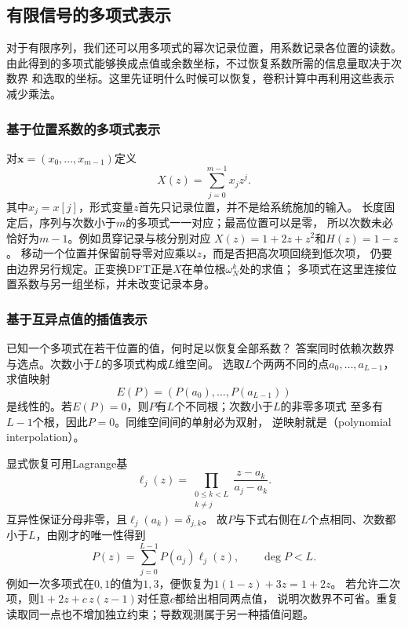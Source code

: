 \subsection{有限信号的多项式表示}
\label{sec:signal-analysis-polynomial-arithmetic}

对于有限序列，我们还可以用多项式的幂次记录位置，用系数记录各位置的读数。
由此得到的多项式能够换成点值或余数坐标，不过恢复系数所需的信息量取决于次数界
和选取的坐标。这里先证明什么时候可以恢复，卷积计算中再利用这些表示减少乘法。

\subsubsection{基于位置系数的多项式表示}

对$\bm x=(x_0,\ldots,x_{m-1})$定义
\[
  X(z)=\sum_{j=0}^{m-1}x_jz^j.
\]
其中$x_j=x[j]$，形式变量$z$首先只记录位置，并不是给系统施加的输入。
长度固定后，序列与次数小于$m$的多项式一一对应；最高位置可以是零，
所以次数未必恰好为$m-1$。例如贯穿记录与核分别对应
$X(z)=1+2z+z^2$和$H(z)=1-z$。
移动一个位置并保留前导零对应乘以$z$，而是否把高次项回绕到低次项，
仍要由边界另行规定。正变换DFT正是$X$在单位根$\omega_N^k$处的求值；
多项式在这里连接位置系数与另一组坐标，并未改变记录本身。

\subsubsection{基于互异点值的插值表示}

已知一个多项式在若干位置的值，何时足以恢复全部系数？
答案同时依赖次数界与选点。次数小于$L$的多项式构成$L$维空间。
选取$L$个两两不同的点$a_0,\ldots,a_{L-1}$，求值映射
\[
  E(P)=(P(a_0),\ldots,P(a_{L-1}))
\]
是线性的。若$E(P)=0$，则$P$有$L$个不同根；次数小于$L$的非零多项式
至多有$L-1$个根，因此$P=0$。同维空间间的单射必为双射，
逆映射就是（polynomial interpolation）。

显式恢复可用Lagrange基
\[
  \ell_j(z)=\prod_{\substack{0\leq k<L\\k\neq j}}
  \frac{z-a_k}{a_j-a_k}.
\]
互异性保证分母非零，且$\ell_j(a_k)=\delta_{j,k}$。
故$P$与下式右侧在$L$个点相同、次数都小于$L$，由刚才的唯一性得到
\begin{equation}
  P(z)=\sum_{j=0}^{L-1}P(a_j)\ell_j(z),\qquad\deg P<L.
  \label{eq:signal-analysis-lagrange-interpolation}
\end{equation}
例如一次多项式在$0,1$的值为$1,3$，便恢复为$1(1-z)+3z=1+2z$。
若允许二次项，则$1+2z+c\,z(z-1)$对任意$c$都给出相同两点值，
说明次数界不可省。重复读取同一点也不增加独立约束；导数观测属于另一种插值问题。

